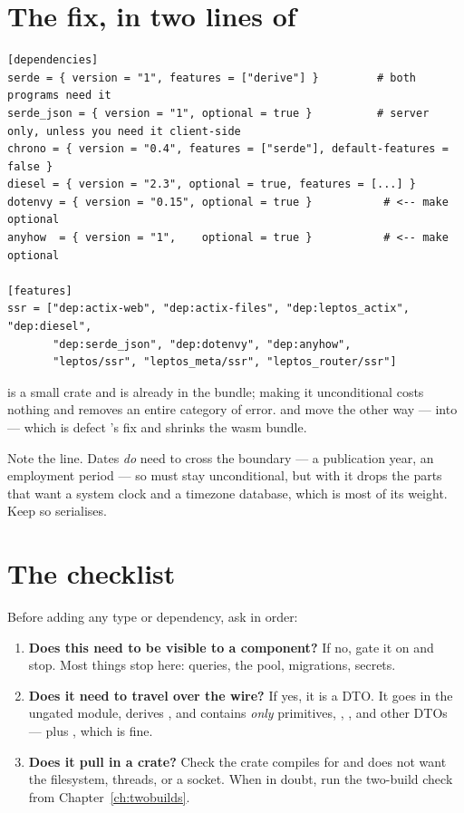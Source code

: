 \section{The fix, in two lines of }

\begin{lstlisting}[style=toml,caption={\code{serde} becomes unconditional; the server-only crates stay optional.}]
[dependencies]
serde = { version = "1", features = ["derive"] }         # both programs need it
serde_json = { version = "1", optional = true }          # server only, unless you need it client-side
chrono = { version = "0.4", features = ["serde"], default-features = false }
diesel = { version = "2.3", optional = true, features = [...] }
dotenvy = { version = "0.15", optional = true }           # <-- make optional
anyhow  = { version = "1",    optional = true }           # <-- make optional

[features]
ssr = ["dep:actix-web", "dep:actix-files", "dep:leptos_actix", "dep:diesel",
       "dep:serde_json", "dep:dotenvy", "dep:anyhow",
       "leptos/ssr", "leptos_meta/ssr", "leptos_router/ssr"]
\end{lstlisting}

 is a small crate and is already in the bundle; making it unconditional costs nothing
and removes an entire category of error.  and  move the other way ---
into  --- which is defect 's fix and shrinks the wasm bundle.

Note the  line. Dates \emph{do} need to cross the boundary --- a publication year, an
employment period --- so  must stay unconditional, but with
 it drops the parts that want a system clock and a timezone
database, which is most of its weight. Keep  so 
serialises.

\section{The checklist}

Before adding any type or dependency, ask in order:

\begin{enumerate}
  \item \textbf{Does this need to be visible to a component?} If no, gate it on  and
    stop. Most things stop here: queries, the pool, migrations, secrets.
  \item \textbf{Does it need to travel over the wire?} If yes, it is a DTO. It goes in the
    ungated  module, derives , and contains
    \emph{only} primitives, , ,  and other DTOs --- plus
    , which is fine.
  \item \textbf{Does it pull in a crate?} Check the crate compiles for
     and does not want the filesystem, threads, or a socket. When in
    doubt, run the two-build check from Chapter~\ref{ch:twobuilds}.
\end{enumerate}

